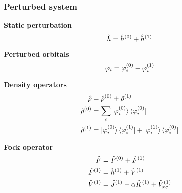 \begin{frame}
    \frametitle{Perturbed system}
    \centering
    \textbf{Static perturbation}
    \begin{equation}
        \nonumber
        \hat{h} = \hat{h}^{(0)} + \hat{h}^{(1)}
    \end{equation}

    \textbf{Perturbed orbitals}
    \begin{equation}
        \nonumber
        \varphi_i = \varphi_i^{(0)} + \varphi_i^{(1)}
    \end{equation}

    \textbf{Density operators}
    \begin{align}
        \nonumber
        \hat{\rho} &= \hat{\rho}^{(0)} + \hat{\rho}^{(1)}\\
        \nonumber
        \hat{\rho}^{(0)} &= \sum_i
        \ket{\varphi_i^{(0)}}\bra{\varphi_i^{(0)}}\\
        \nonumber
        \hat{\rho}^{(1)} &=
        \ket{\varphi_i^{(0)}}\bra{\varphi_i^{(1)}} +
        \ket{\varphi_i^{(1)}}\bra{\varphi_i^{(0)}}
    \end{align}

    \textbf{Fock operator}
    \begin{align}
        \nonumber
        \hat{F} &= \hat{F}^{(0)} + \hat{F}^{(1)}\\
        \hat{F}^{(1)} &= \hat{h}^{(1)} + \hat{V}^{(1)}\\
        \hat{V}^{(1)} &= 
        \hat{J}^{(1)} - \alpha
        \hat{K}^{(1)} +
        \hat{V}_{xc}^{(1)}
    \end{align}
\end{frame}

